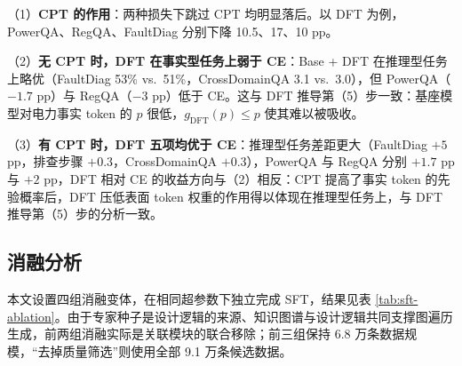\documentclass[fontset=fandol,type=master,campus=shenzhen,etitleauto=true]{hithesisbook}
\begin{document}
\begin{table}[htbp]
\centering
\caption{初始化基座（Base vs.\ CPT）与微调目标（Standard CE vs.\ DFT）的 $2 \times 2$ 对比结果}
\label{tab:cpt-dft-synergy}
\small
\setlength{\tabcolsep}{4pt}
\renewcommand{\arraystretch}{1.15}
\end{table}

（1）\textbf{CPT 的作用}：两种损失下跳过 CPT 均明显落后。以 DFT 为例，PowerQA、RegQA、FaultDiag 分别下降 10.5、17、10 pp。

（2）\textbf{无 CPT 时，DFT 在事实型任务上弱于 CE}：Base + DFT 在推理型任务上略优（FaultDiag 53\% vs.\ 51\%，CrossDomainQA 3.1 vs.\ 3.0），但 PowerQA（$-1.7$ pp）与 RegQA（$-3$ pp）低于 CE。这与 DFT 推导第（5）步一致：基座模型对电力事实 token 的 $p$ 很低，$g_{\text{DFT}}(p) \le p$ 使其难以被吸收。

（3）\textbf{有 CPT 时，DFT 五项均优于 CE}：推理型任务差距更大（FaultDiag $+5$ pp，排查步骤 $+0.3$，CrossDomainQA $+0.3$），PowerQA 与 RegQA 分别 $+1.7$ pp 与 $+2$ pp，DFT 相对 CE 的收益方向与（2）相反：CPT 提高了事实 token 的先验概率后，DFT 压低表面 token 权重的作用得以体现在推理型任务上，与 DFT 推导第（5）步的分析一致。

\subsection{消融分析}\label{ux6d88ux878dux5206ux6790}

本文设置四组消融变体，在相同超参数下独立完成 SFT，结果见表 \ref{tab:sft-ablation}。由于专家种子是设计逻辑的来源、知识图谱与设计逻辑共同支撑图遍历生成，前两组消融实际是关联模块的联合移除；前三组保持 6.8 万条数据规模，“去掉质量筛选”则使用全部 9.1 万条候选数据。
\end{document}
